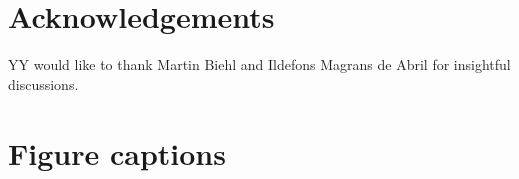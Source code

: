\documentclass[utf8]{frontiersSCNS}
\begin{document}
\section*{Acknowledgements}
YY would like to thank Martin Biehl and Ildefons Magrans de Abril for insightful discussions.








\section*{Figure captions}
\end{document}
